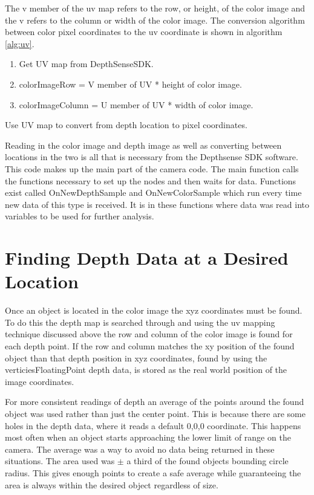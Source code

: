 The v member of the uv map refers to the row, or height, of the color image and the v refers to the column or width of the color image. The conversion algorithm between color pixel coordinates to the uv coordinate is shown in algorithm \ref{alg:uv}.

\begin{algorithm}
	\begin{enumerate}
		\item Get UV map from DepthSenseSDK.
		\item colorImageRow = V member of UV * height of color image.
		\item colorImageColumn = U member of UV * width of color image.

	\end{enumerate}
\caption{Use UV map to convert from depth location to pixel coordinates.}
\label{alg:uv}
\end{algorithm}

Reading in the color image and depth image as well as converting between locations in the two is all that is necessary from the Depthsense SDK software. This code makes up the main part of the camera code. The main function calls the functions necessary to set up the nodes and then waits for data. Functions exist called OnNewDepthSample and OnNewColorSample which run every time new data of this type is received. It is in these functions where data was read into variables to be used for further analysis.

\section{Finding Depth Data at a Desired Location}
Once an object is located in the color image the xyz coordinates must be found. To do this the depth map is searched through and using the uv mapping technique discussed above the row and column of the color image is found for each depth point. If the row and column matches the xy position of the found object than that depth position in xyz coordinates, found by using the verticiesFloatingPoint depth data, is stored as the real world position of the image coordinates.

 For more consistent readings of depth an average of the points around the found object was used rather than just the center point. This is because there are some holes in the depth data, where it reads a default 0,0,0 coordinate. This happens most often when an object starts approaching the lower limit of range on the camera. The average was a way to avoid no data being returned in these situations. The area used was $\pm$ a third of the found objects bounding circle radius. This gives enough points to create a safe average while guaranteeing the area is always within the desired object regardless of size. 
 
